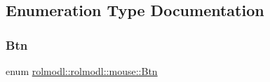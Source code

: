 \subsection{Enumeration Type Documentation}
\mbox{\label{namespacerolmodl_1_1rolmodl_1_1mouse_a5ed523191c7ec81f6e69f02b9a616ebf}} 
\subsubsection{\texorpdfstring{Btn}{Btn}}
{\footnotesize\ttfamily enum \mbox{\hyperlink{namespacerolmodl_1_1rolmodl_1_1mouse_a5ed523191c7ec81f6e69f02b9a616ebf}{rolmodl\+::rolmodl\+::mouse\+::\+Btn}}\hspace{0.3cm}{\ttfamily [strong]}}

